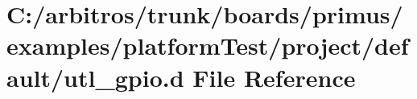 \hypertarget{boards_2primus_2examples_2platform_test_2project_2default_2utl__gpio_8d}{\section{C\-:/arbitros/trunk/boards/primus/examples/platform\-Test/project/default/utl\-\_\-gpio.d File Reference}
\label{boards_2primus_2examples_2platform_test_2project_2default_2utl__gpio_8d}
}

